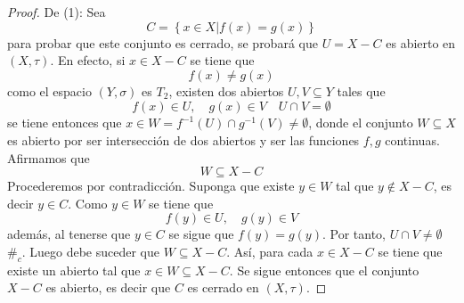 \documentclass[12pt]{report}
\theoremstyle{largebreak}
\newcommand\contradiction{\ensuremath{\#_c}}
\begin{document}
    \begin{proof}
        De (1): Sea
        \begin{equation*}
            C=\left\{x\in X\Big|f(x)=g(x) \right\}
        \end{equation*}
        para probar que este conjunto es cerrado, se probará que $U=X-C$ es abierto en $(X,\tau)$. En efecto, si $x\in X-C$ se tiene que
        \begin{equation*}
            f(x)\neq g(x)
        \end{equation*}
        como el espacio $(Y,\sigma)$ es $T_2$, existen dos abiertos $U,V\subseteq Y$ tales que
        \begin{equation*}
            f(x)\in U,\quad g(x)\in V\quad U\cap V=\emptyset
        \end{equation*}
        se tiene entonces que $x\in W=f^{-1}(U)\cap g^{-1}(V)\neq\emptyset$, donde el conjunto $W\subseteq X$ es abierto por ser intersección de dos abiertos y ser las funciones $f,g$ continuas. Afirmamos que
        \begin{equation*}
            W\subseteq X-C
        \end{equation*}
        Procederemos por contradicción. Suponga que existe $y\in W$ tal que $y\notin X-C$, es decir $y\in C$. Como $y\in W$ se tiene que
        \begin{equation*}
            f(y)\in U,\quad g(y)\in V
        \end{equation*}
        además, al tenerse que $y\in C$ se sigue que $f(y)=g(y)$. Por tanto, $U\cap V\neq\emptyset$\contradiction. Luego debe suceder que $W\subseteq X-C$. Así, para cada $x\in X-C$ se tiene que existe un abierto tal que $x\in W\subseteq X-C$. Se sigue entonces que el conjunto $X-C$ es abierto, es decir que $C$ es cerrado en $(X,\tau)$.


\end{proof}
\end{document}
